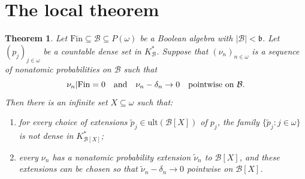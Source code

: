\documentclass[11pt]{amsart}
\newtheorem{theorem}{Theorem}
\theoremstyle{definition}
\newcommand{\Fin}{\mathrm{Fin}}
\newcommand{\ult}{\mathrm{ult}}
\begin{document}
\section*{The local theorem}

\begin{theorem}\label{thm:local}
Let \(\Fin\subseteq\mathcal B\subseteq P(\omega)\) be a Boolean algebra with
\(|\mathcal B|<\mathfrak b\).  Let \((p_j)_{j\in\omega}\) be a countable dense
set in \(K_\mathcal B^*\).  Suppose that \((\nu_n)_{n\in\omega}\) is a sequence
of nonatomic probabilities on \(\mathcal B\) such that
\[
        \nu_n|\Fin=0 \quad\hbox{and}\quad
        \nu_n-\delta_n\to0
        \quad\hbox{pointwise on }\mathcal B.
\]
Then there is an infinite set \(X\subseteq\omega\) such that:
\begin{enumerate}[label=(\roman*)]
\item for every choice of extensions \(\widetilde p_j\in\ult(\mathcal B[X])\)
of \(p_j\), the family \(\{\widetilde p_j:j\in\omega\}\) is not dense in
\(K_{\mathcal B[X]}^*\);
\item every \(\nu_n\) has a nonatomic probability extension
\(\widetilde\nu_n\) to \(\mathcal B[X]\), and these extensions can be chosen so
that \(\widetilde\nu_n-\delta_n\to0\) pointwise on \(\mathcal B[X]\).
\end{enumerate}
\end{theorem}
\end{document}
